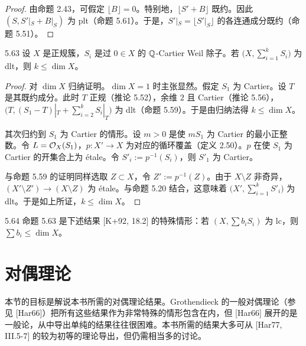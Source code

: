 \begin{proof}
由命题 2.43，可假定 $\lfloor B\rfloor=0$。特别地，$\lfloor S'+B\rfloor$ 既约。因此 $(S,S'|_S+B|_S)$ 为 plt（命题 5.61）。于是，$S'|_S=\lfloor S'|_S\rfloor$ 的各连通成分既约（命题 5.51）。
\end{proof}

\begin{propositionp}{5.63}
设 $X$ 是正规簇，$S_i$ 是过 $0\in X$ 的 $\mathbb{Q}$-Cartier Weil 除子。若 $\bigl(X,\sum_{i=1}^kS_i\bigr)$ 为 dlt，则 $k\le\dim X$。
\end{propositionp}

\begin{proof}
对 $\dim X$ 归纳证明。$\dim X=1$ 时主张显然。假定 $S_1$ 为 Cartier。设 $T$ 是其既约成分。此时 $T$ 正规（推论 5.52），余维 $2$ 且 Cartier（推论 5.56），$\bigl(T,(S_1-T)|_T+\sum_{i=2}^kS_i|_T\bigr)$ 为 dlt（命题 5.59）。于是由归纳法得 $k\le\dim X$。

其次归约到 $S_1$ 为 Cartier 的情形。设 $m>0$ 是使 $mS_1$ 为 Cartier 的最小正整数。令 $L=\mathcal{O}_X(S_1)$，$p\colon X'\to X$ 为对应的循环覆盖（定义 2.50）。$p$ 在使 $S_1$ 为 Cartier 的开集合上为 étale。令 $S'_i:=p^{-1}(S_i)$，则 $S'_1$ 为 Cartier。

与命题 5.59 的证明同样选取 $Z\subset X$，令 $Z':=p^{-1}(Z)$。由于 $X\setminus Z$ 非奇异，$(X'\setminus Z')\to(X\setminus Z)$ 为 étale。与命题 5.20 结合，这意味着 $\bigl(X',\sum_{i=1}^kS'_i\bigr)$ 为 dlt。于是如上所证，$k\le\dim X$。
\end{proof}

\begin{remark}{5.64}
命题 5.63 是下述结果 [K+92, 18.2] 的特殊情形：若 $(X,\sum b_iS_i)$ 为 lc，则 $\sum b_i\le\dim X$。
\end{remark}

\section{对偶理论}

本节的目标是解说本书所需的对偶理论结果。Grothendieck 的一般对偶理论（参见 [Har66]）把所有这些结果作为非常特殊的情形包含在内，但 [Har66] 展开的是一般论，从中导出单纯的结果往往很困难。本书所需的结果大多可从 [Har77, III.5-7] 的较为初等的理论导出，但仍需相当多的讨论。

